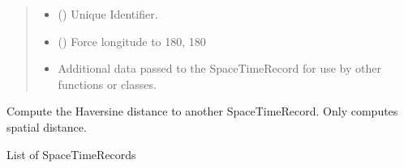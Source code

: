 \documentclass[letterpaper,10pt,english]{sphinxmanual}
\begin{document}
\begin{fulllineitems}
\begin{quote}
\begin{description}
\begin{itemize}
\item {} 
\sphinxAtStartPar
{} (\sphinxstyleliteralemphasis{\sphinxupquote{ | }}) \textendash{} Unique Identifier.

\item {} 
\sphinxAtStartPar
{} () \textendash{} Force longitude to \sphinxhyphen{}180, 180

\item {} 
\sphinxAtStartPar
{} \textendash{} Additional data passed to the SpaceTimeRecord for use by other functions
or classes.

\end{itemize}

\end{description}\end{quote}

\begin{fulllineitems}
\label{\detokenize{users_guide:GeoSpatialTools.octtree.SpaceTimeRecord.distance}}
\pysigstartsignatures
{}
\pysigstopsignatures
\sphinxAtStartPar
Compute the Haversine distance to another SpaceTimeRecord.
Only computes spatial distance.
\begin{quote}\begin{description}
\sphinxAtStartPar
{}

\end{description}\end{quote}

\end{fulllineitems}


\end{fulllineitems}


\begin{fulllineitems}
\label{\detokenize{users_guide:GeoSpatialTools.octtree.SpaceTimeRecords}}
\pysigstartsignatures
{}
\pysigstopsignatures
\sphinxAtStartPar
List of SpaceTimeRecords

\end{fulllineitems}
\end{document}
